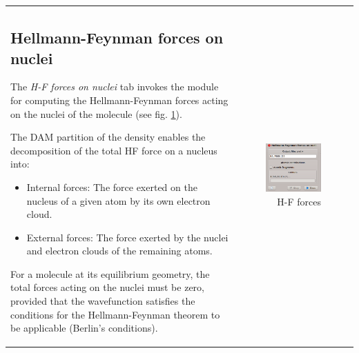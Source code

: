 \documentclass[10pt]{article}
\begin{document}
\vspace*{5mm}
\begin{tabular}{lr}
\hspace*{-3mm}
\begin{minipage}{.6\linewidth}

\subsection{Hellmann-Feynman forces on nuclei
\label{sec:2.10}\index{Hellmann-Feynman!forces}}

The {\it H-F forces on nuclei}\index{forces} tab invokes the module
for computing the Hellmann-Feynman forces acting on the nuclei of the molecule
(see fig. \ref{fig:2_10}).

The DAM\index{DAM} partition of the density enables the decomposition of
the total HF force on a nucleus into:

\begin{itemize}
\item Internal forces\index{forces!internal}: The force exerted on the nucleus of a given atom by its own electron cloud.
\item External forces\index{forces!external}: The force exerted by the nuclei and electron clouds of the remaining atoms.
\end{itemize}

For a molecule at its equilibrium geometry,
the total forces\index{forces!total} acting on the nuclei must be zero,
provided that the wavefunction satisfies the conditions
for the Hellmann-Feynman theorem\index{Hellmann-Feynman!theorem} to be applicable (Berlin's conditions\footnotemark\index{Hellmann-Feynman!theorem!fulfillment}).

\end{minipage}
&
\begin{minipage}{.4\linewidth}

\vspace*{-1.0cm}
\begin{figure}[H]
\begin{center}
\includegraphics[width=.7\linewidth]{damqt_fig_2_10.png}
\end{center}
\caption{H-F forces\label{fig:2_10}}
\end{figure}
\end{minipage}
\end{tabular}
\vspace*{1pt}
\end{document}
